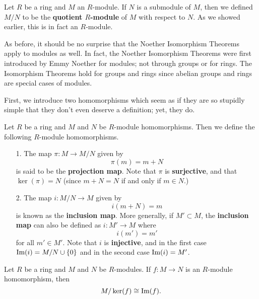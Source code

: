 \begin{definition}
    Let $R$ be a ring and $M$ an $R$-module. If $N$ is a submodule
    of $M$, then we defined $M/N$ to be the \textbf{quotient
    $R$-module} of $M$ with respect to $N$. As we showed earlier,
    this is in fact an $R$-module.
\end{definition}

As before, it should be no surprise that the Noether Isomorphism
Theorems apply to modules as well. In fact, the Noether
Isomorphism Theorems were first introduced by Emmy Noether for
modules; not through groups or for rings. The Isomorphism Theorems
hold for groups and rings since abelian groups and rings are
special cases of modules. 

First, we introduce two homomorphisms which seem as if they are so stupidly
simple that they don't even deserve a definition; yet, they do. 

\begin{definition}
    Let $R$ be a ring and $M$ and $N$ be $R$-module homomorphisms.
    Then we define the following $R$-module homomorphisms.
    \begin{itemize}
        \item[1.] The map $\pi: M \to M/N$ given by 
        \[
            \pi(m) = m + N
        \] 
        is said to be the \textbf{projection map}. Note that $\pi$
        is
        \textbf{surjective}, and that $\ker(\pi) = N$ (since $m +
        N = N$ if and only if $m \in N$.)

        \item[2.] The map $i: M/N \to M$ given by 
        \[
            i(m + N) = m                
        \]
        is known as the \textbf{inclusion map}. More generally, if
        $M' \subset M$, the \textbf{inclusion map} can also be
        defined as $i: M' \to M$ where 
        \[
            i(m') = m'
        \]
        for all $m' \in M'$. Note that $i$ is \textbf{injective},
        and in the first case $\mbox{Im}(i) = M/N\cup \{0\}$ and in the
        second case $\mbox{Im}(i) = M'$.
    \end{itemize}
\end{definition}

\begin{thm}
    Let $R$ be a ring and $M$ and $N$ be $R$-modules. If $f: M \to
    N$ is an $R$-module homomorphism, then 
    \[
        M/\ker(f) \cong \mbox{Im}(f).  
    \]
    \vspace{-0.8cm}
\end{thm}

